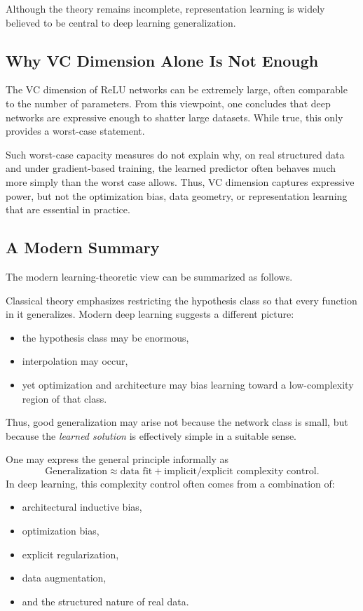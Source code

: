 Although the theory remains incomplete, representation learning is widely believed to be central to deep learning generalization.

\subsection{Why VC Dimension Alone Is Not Enough}

The VC dimension of ReLU networks can be extremely large, often comparable to the number of parameters. From this viewpoint, one concludes that deep networks are expressive enough to shatter large datasets. While true, this only provides a worst-case statement.

Such worst-case capacity measures do not explain why, on real structured data and under gradient-based training, the learned predictor often behaves much more simply than the worst case allows. Thus, VC dimension captures expressive power, but not the optimization bias, data geometry, or representation learning that are essential in practice.

\subsection{A Modern Summary}

The modern learning-theoretic view can be summarized as follows.

Classical theory emphasizes restricting the hypothesis class so that every function in it generalizes. Modern deep learning suggests a different picture:
\begin{itemize}
    \item the hypothesis class may be enormous,
    \item interpolation may occur,
    \item yet optimization and architecture may bias learning toward a low-complexity region of that class.
\end{itemize}

Thus, good generalization may arise not because the network class is small, but because the \emph{learned solution} is effectively simple in a suitable sense.

One may express the general principle informally as
\[
\text{Generalization} \approx \text{data fit} + \text{implicit/explicit complexity control}.
\]
In deep learning, this complexity control often comes from a combination of:
\begin{itemize}
    \item architectural inductive bias,
    \item optimization bias,
    \item explicit regularization,
    \item data augmentation,
    \item and the structured nature of real data.
\end{itemize}

